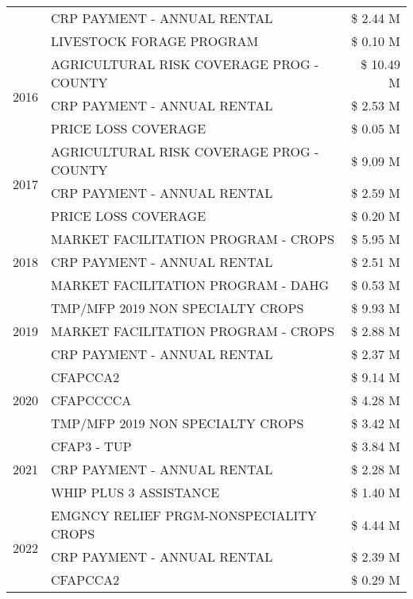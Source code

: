 \begin{tabular}{llr}
 & CRP PAYMENT - ANNUAL RENTAL & \$ 2.44 M \\
 & LIVESTOCK FORAGE PROGRAM & \$ 0.10 M \\
\cline{1-3}
\multirow[t]{3}{*}{2016} & AGRICULTURAL RISK COVERAGE PROG - COUNTY & \$ 10.49 M \\
 & CRP PAYMENT - ANNUAL RENTAL & \$ 2.53 M \\
 & PRICE LOSS COVERAGE & \$ 0.05 M \\
\cline{1-3}
\multirow[t]{3}{*}{2017} & AGRICULTURAL RISK COVERAGE PROG - COUNTY & \$ 9.09 M \\
 & CRP PAYMENT - ANNUAL RENTAL & \$ 2.59 M \\
 & PRICE LOSS COVERAGE & \$ 0.20 M \\
\cline{1-3}
\multirow[t]{3}{*}{2018} & MARKET FACILITATION PROGRAM - CROPS & \$ 5.95 M \\
 & CRP PAYMENT - ANNUAL RENTAL & \$ 2.51 M \\
 & MARKET FACILITATION PROGRAM - DAHG & \$ 0.53 M \\
\cline{1-3}
\multirow[t]{3}{*}{2019} & TMP/MFP 2019 NON SPECIALTY CROPS & \$ 9.93 M \\
 & MARKET FACILITATION PROGRAM - CROPS & \$ 2.88 M \\
 & CRP PAYMENT - ANNUAL RENTAL & \$ 2.37 M \\
\cline{1-3}
\multirow[t]{3}{*}{2020} & CFAPCCA2 & \$ 9.14 M \\
 & CFAPCCCCA & \$ 4.28 M \\
 & TMP/MFP 2019 NON SPECIALTY CROPS & \$ 3.42 M \\
\cline{1-3}
\multirow[t]{3}{*}{2021} & CFAP3 - TUP & \$ 3.84 M \\
 & CRP PAYMENT - ANNUAL RENTAL & \$ 2.28 M \\
 & WHIP PLUS 3 ASSISTANCE & \$ 1.40 M \\
\cline{1-3}
\multirow[t]{3}{*}{2022} & EMGNCY RELIEF PRGM-NONSPECIALITY CROPS & \$ 4.44 M \\
 & CRP PAYMENT - ANNUAL RENTAL & \$ 2.39 M \\
 & CFAPCCA2 & \$ 0.29 M \\
\cline{1-3}
\bottomrule
\end{tabular}
